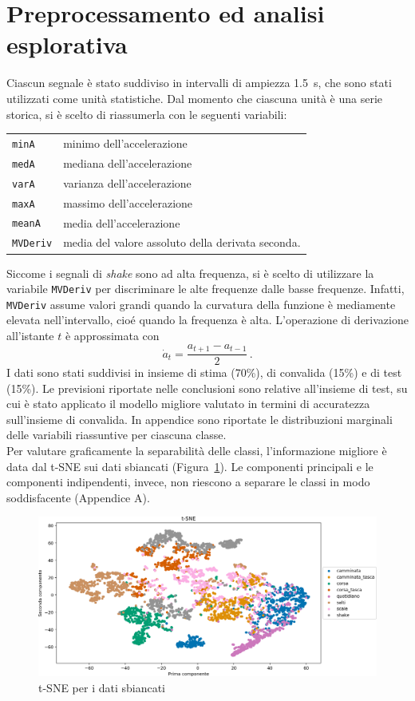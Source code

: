 \documentclass[./main.tex]{subfiles}
\begin{document}
\section{Preprocessamento ed analisi esplorativa}
Ciascun segnale è stato suddiviso in intervalli di ampiezza \SI{1.5}{s}, che sono stati utilizzati come unità statistiche. Dal momento che ciascuna unità è una serie storica, si è scelto di riassumerla con le seguenti variabili:
\begin{table}[H]
	\centering
	\begin{tabular}{ll}
		\texttt{minA}& minimo dell'accelerazione\\
		\texttt{medA}& mediana dell'accelerazione\\
		\texttt{varA}& varianza dell'accelerazione\\
		\texttt{maxA}& massimo dell'accelerazione\\
		\texttt{meanA}& media dell'accelerazione\\
		\texttt{MVDeriv}& media del valore assoluto della derivata seconda.
	\end{tabular}
\end{table}
Siccome i segnali di {\em shake} sono ad alta frequenza, si è scelto di utilizzare la variabile \texttt{MVDeriv} per discriminare le alte frequenze dalle basse frequenze. Infatti, \texttt{MVDeriv} assume valori grandi quando la curvatura della funzione è mediamente elevata nell'intervallo, cioé quando la frequenza è alta. L'operazione di derivazione all'istante $t$ è approssimata con\cite{NumpyGradientNumPy}
\[
\dot{a}_t = \dfrac{a_{t + 1} - a_{t - 1}}{2}\,.
\]
I dati sono stati suddivisi in insieme di stima (70\%), di convalida (15\%) e di test (15\%). Le previsioni riportate nelle conclusioni sono relative all'insieme di test, su cui è stato applicato il modello migliore valutato in termini di accuratezza sull\rq{}insieme di convalida.
In appendice sono riportate le distribuzioni marginali delle variabili riassuntive per ciascuna classe.\\

Per valutare graficamente la separabilità delle classi, l'informazione migliore è data dal t-SNE sui dati sbiancati (Figura~\ref{fig:tsne}). Le componenti principali e le componenti indipendenti, invece, non riescono a separare le classi in modo soddisfacente (Appendice A).
\begin{figure}[H]
	\centering
	\includegraphics[width=.8\textwidth]{../../figure/t-SNE.png}
	\caption{{ t-SNE per i dati sbiancati}}
	\label{fig:tsne}
\end{figure}
\end{document}
